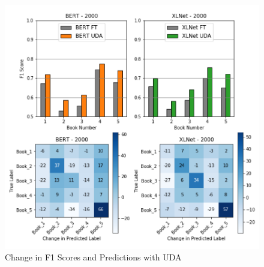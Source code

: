 \documentclass[twoside,twocolumn,10pt]{article}
\begin{document}
\begin{figure}
	\includegraphics[width=\linewidth]{combo.png}
	\caption{Change in F1 Scores and Predictions with UDA}
	\label{fig:combo}
\end{figure}
\end{document}
